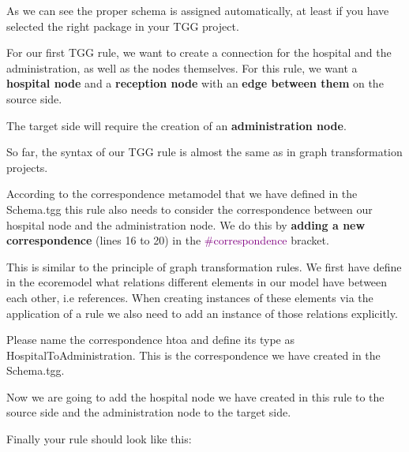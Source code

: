 As we can see the proper schema is assigned automatically, at least if you have selected the right package in your TGG project.\newline

For our first TGG rule, we want to create a connection for the hospital and the administration, as well as the nodes themselves. For this rule, we want a \textbf{hospital node} and a \textbf{reception node} with an \textbf{edge between them} on the source side.

The target side will require the creation of an \textbf{administration node}.

So far, the syntax of our TGG rule is almost the same as in graph transformation projects.\newline

According to the correspondence metamodel that we have defined in the Schema.tgg this rule also needs to consider the correspondence between our hospital node and the administration node. We do this by \textbf{adding a new correspondence} (lines 16 to 20) in the \textcolor{Purple}{\#correspondence} bracket.

This is similar to the principle of graph transformation rules. We first have define in the ecoremodel what relations different elements in our model have between each other, i.e references.
When creating instances of these elements via the application of a rule we also need to add an instance of those relations explicitly.

\clearpage

Please name the correspondence \textsf{htoa} and define its type as \textsf{HospitalToAdministration}. This is the correspondence we have created in the Schema.tgg. 

Now we are going to add the hospital node we have created in this rule to the source side and the administration node to the target side.\newline

Finally your rule should look like this: \newline

